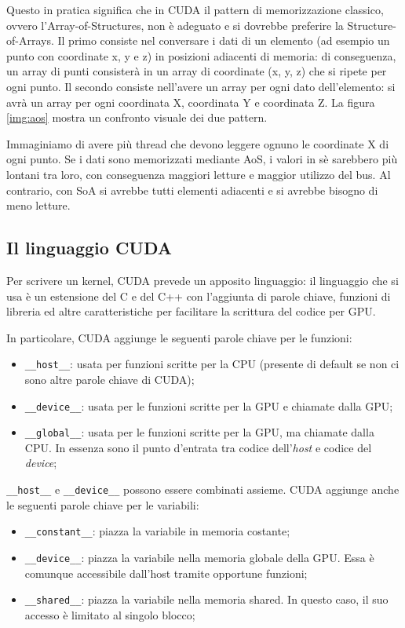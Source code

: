 \documentclass[12pt,a4paper,openright,twoside]{report}
\begin{document}
Questo in pratica significa che in CUDA il pattern di memorizzazione classico, ovvero l'Array-of-Structures, non è adeguato e si dovrebbe preferire la Structure-of-Arrays. Il primo consiste nel conversare i dati di un elemento (ad esempio un punto con coordinate x, y e z) in posizioni adiacenti di memoria: di conseguenza, un array di punti consisterà in un array di coordinate (x, y, z) che si ripete per ogni punto. Il secondo consiste nell'avere un array per ogni dato dell'elemento: si avrà un array per ogni coordinata X, coordinata Y e coordinata Z. La figura \ref{img:aos} mostra un confronto visuale dei due pattern.

Immaginiamo di avere più thread che devono leggere ognuno le coordinate X di ogni punto. Se i dati sono memorizzati mediante AoS, i valori in sè sarebbero più lontani tra loro, con conseguenza maggiori letture e maggior utilizzo del bus. Al contrario, con SoA si avrebbe tutti elementi adiacenti e si avrebbe bisogno di meno letture.

\subsection{Il linguaggio CUDA}

Per scrivere un kernel, CUDA prevede un apposito linguaggio: il linguaggio che si usa è un estensione del C e del C++ con l'aggiunta di parole chiave, funzioni di libreria ed altre caratteristiche per facilitare la scrittura del codice per GPU.

In particolare, CUDA aggiunge le seguenti parole chiave per le funzioni:

\begin{itemize}
    \item \verb|__host__|: usata per funzioni scritte per la CPU (presente di default se non ci sono altre parole chiave di CUDA);
    \item \verb|__device__|: usata per le funzioni scritte per la GPU e chiamate dalla GPU;
    \item \verb|__global__|: usata per le funzioni scritte per la GPU, ma chiamate dalla CPU. In essenza sono il punto d'entrata tra codice dell'\textit{host} e codice del \textit{device};
\end{itemize}

\verb|__host__| e \verb|__device__| possono essere combinati assieme. CUDA aggiunge anche le seguenti parole chiave per le variabili:

\begin{itemize}
    \item \verb|__constant__|: piazza la variabile in memoria costante;
    \item \verb|__device__|: piazza la variabile nella memoria globale della GPU. Essa è comunque accessibile dall'host tramite opportune funzioni;
    \item \verb|__shared__|: piazza la variabile nella memoria shared. In questo caso, il suo accesso è limitato al singolo blocco;
\end{itemize}
\end{document}
